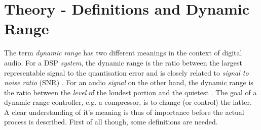 \documentclass[../main2.tex]{subfiles}
\begin{document}
\FloatBarrier
\section{Theory - Definitions and Dynamic Range} \label{theory_dynamic_range}
The term \emph{dynamic range} has two different meanings in the context of digital audio. For a DSP \emph{system}, the dynamic range is the ratio between the largest representable signal to the quantisation error and is closely related to \emph{signal to noise ratio} (SNR)  \cite{wilson1993filter}. For an audio \emph{signal} on the other hand, the dynamic range is the ratio between the \emph{level} of the loudest portion and the quietest \cite{davis1989sound}. The goal of a dynamic range controller, e.g. a compressor, is to change (or control) the latter. A clear understanding of it's meaning is thus of importance before the actual process is described. First of all though, some definitions are needed.
\end{document}
